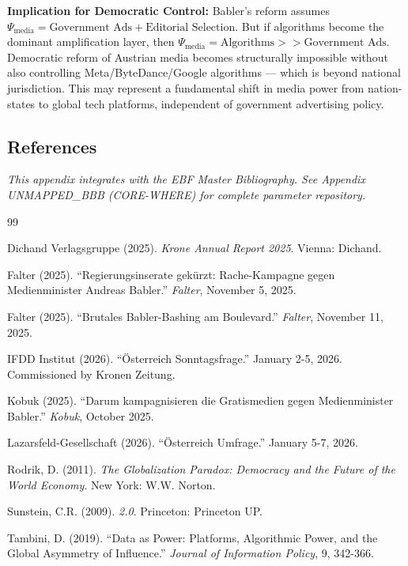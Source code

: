 \begin{enumerate}
  \textbf{Implication for Democratic Control:} Babler's reform assumes $\Psi_{\text{media}} =
  \text{Government Ads} + \text{Editorial Selection}$. But if algorithms become the
  dominant amplification layer, then $\Psi_{\text{media}} = \text{Algorithms} >> \text{Government Ads}$.
  Democratic reform of Austrian media becomes structurally impossible without also
  controlling Meta/ByteDance/Google algorithms — which is beyond national jurisdiction.
  This may represent a fundamental shift in media power from nation-states to global
  tech platforms, independent of government advertising policy.
\end{enumerate}


\subsection{References}

\textit{This appendix integrates with the EBF Master Bibliography.
See Appendix UNMAPPED_BBB (CORE-WHERE) for complete parameter repository.}

\nocite{bcm_master}

\begin{thebibliography}{99}

 Dichand Verlagsgruppe (2025). \textit{Krone Annual Report 2025}.
  Vienna: Dichand.

 Falter (2025). ``Regierungsinserate gekürzt: Rache-Kampagne
  gegen Medienminister Andreas Babler.'' \textit{Falter}, November 5, 2025.

 Falter (2025). ``Brutales Babler-Bashing am Boulevard.''
  \textit{Falter}, November 11, 2025.

 IFDD Institut (2026). ``Österreich Sonntagsfrage.'' January 2-5, 2026.
  Commissioned by Kronen Zeitung.

 Kobuk (2025). ``Darum kampagnisieren die Gratismedien gegen
  Medienminister Babler.'' \textit{Kobuk}, October 2025.

 Lazarsfeld-Gesellschaft (2026). ``Österreich Umfrage.''
  January 5-7, 2026.

 Rodrik, D. (2011). \textit{The Globalization Paradox: Democracy
  and the Future of the World Economy}. New York: W.W. Norton.

 Sunstein, C.R. (2009). \textit{2.0}. Princeton: Princeton UP.

 Tambini, D. (2019). ``Data as Power: Platforms, Algorithmic
  Power, and the Global Asymmetry of Influence.'' \textit{Journal of Information
  Policy}, 9, 342-366.

\end{thebibliography}



